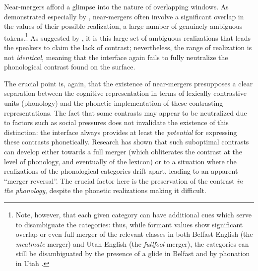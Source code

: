 Near\hyp mergers afford a glimpse into the nature of overlapping windows. As demonstrated especially by \citet{milroy80:_wheny}, near\hyp mergers often involve a significant overlap in the values of their possible realization, \ie a large number of genuinely ambiguous tokens.\footnote{Note, however, that each given category can have additional cues which serve to disambiguate the categories: thus, while formant values show significant overlap or even full merger of the relevant classes in both Belfast English (the \emph{meat\dash mate} merger) and Utah English (the \emph{full\dash fool} merger), the categories can still be disambiguated by the presence of a glide in Belfast \citep{milroy80:_wheny} and by phonation in Utah \citep{di90:_phonat_utah}.} As suggested by \citet{milroy80:_wheny}, it is this large set of ambiguous realizations that leads the speakers to claim the lack of contrast; nevertheless, the range of realization is not \emph{identical}, meaning that the interface again fails to fully neutralize the phonological contrast found on the surface.

The crucial point is, again, that the existence of near\hyp mergers presupposes a clear separation between the cognitive representation in terms of lexically contrastive units (\ie phonology) and the phonetic implementation of these contrasting representations. The fact that some contrasts may appear to be neutralized due to factors such as social pressures does not invalidate the existence of this distinction: the interface always provides at least the \emph{potential} for expressing these contrasts phonetically. Research has shown that such suboptimal contrasts can develop either towards a full merger (which obliterates the contrast at the level of phonology, and eventually of the lexicon) or to a situation where the realizations of the phonological categories drift apart, leading to an apparent \enquote{merger reversal}. The crucial factor here is the preservation of the contrast \emph{in the phonology}, despite the phonetic realizations making it difficult.


